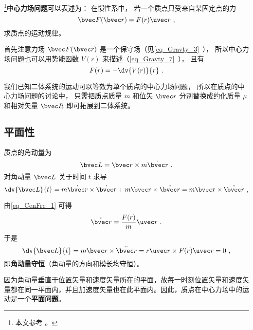 
\footnote{本文参考 \cite{Goldstein}。}\textbf{中心力场问题}可以表述为： 在惯性系中， 若一个质点只受来自某固定点的力
\begin{equation}\label{eq_CenFrc_1}
\bvec F(\bvec r) = F(r) \uvec r~,
\end{equation}
求质点的运动规律。

首先注意力场 $\bvec F(\bvec r)$ 是一个保守场（见\autoref{eq_Gravty_3}~）， 所以中心力场问题也可以用势能函数 $V(r)$ 来描述（\autoref{eq_Gravty_7}~）， 且有
\begin{equation}
F(r) = -\dv{V(r)}{r}~.
\end{equation}

我们已知二体系统的运动可以等效为单个质点的中心力场问题， 所以在质点的中心力场问题的讨论中， 只需把质点质量 $m$ 和位矢 $\bvec r$ 分别替换成约化质量 $\mu$ 和相对矢量 $\bvec R$ 即可拓展到二体系统。

\subsection{平面性}
质点的角动量为
\begin{equation}
\bvec L =\bvec r \times m \dot{\bvec r}~.
\end{equation}
对角动量 $\bvec L$ 关于时间 $t$ 求导
\begin{equation}
\dv{\bvec L}{t} =m \dot{\bvec r} \times \dot{\bvec r} +m \bvec r \times \ddot{\bvec r}=m \bvec r \times \ddot{\bvec r}~,
\end{equation}

由\autoref{eq_CenFrc_1} 可得
\begin{equation}
\ddot{\bvec r} = \frac{F(r)}{m}\uvec r~.
\end{equation}
于是
\begin{equation}
\dv{\bvec L}{t} =m \bvec r \times \ddot{\bvec r}= r \uvec r \times F(r)\uvec r=0~,
\end{equation}
即\textbf{角动量守恒}（角动量的方向和模长均守恒）。

因为角动量垂直于位置矢量和速度矢量所在的平面，故每一时刻位置矢量和速度矢量都在同一平面内，并且加速度矢量也在此平面内。因此，质点在中心力场中的运动是一个\textbf{平面问题}。

